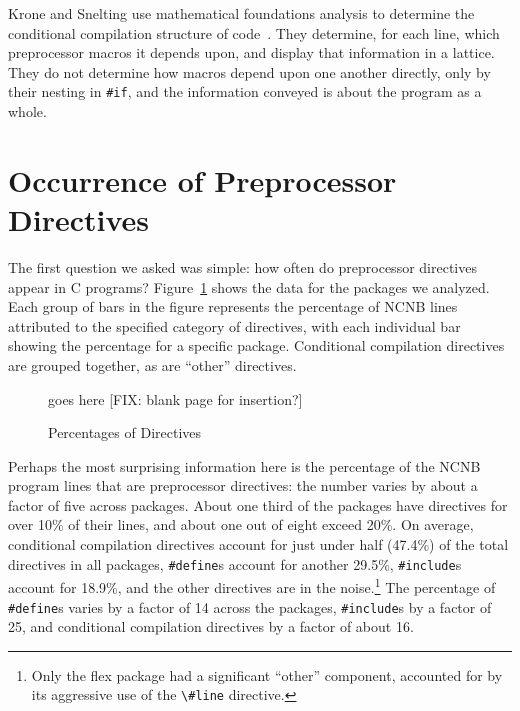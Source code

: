 Krone and Snelting use mathematical foundations analysis to determine the
conditional compilation structure of code~\cite{Krone94}.  They determine,
for each line, which preprocessor macros it depends upon, and display that
information in a lattice.  They do not determine how macros depend upon one
another directly, only by their nesting in \verb|#if|, and the information
conveyed is about the program as a whole.


\section{Occurrence of Preprocessor Directives}\label{sec:directives}

The first question we asked was simple: how often do
preprocessor directives appear in C programs?
Figure~\ref{fig:directives} shows the data for the packages we
analyzed.  Each group of bars in the figure represents the percentage of
NCNB lines attributed to the specified category of directives, with each
individual bar showing the percentage for a specific package.  Conditional
compilation directives are grouped together, as are ``other'' directives.


\begin{figure}
goes here [FIX: blank page for insertion?]
\caption{Percentages of Directives\label{fig:directives}}
\end{figure}

Perhaps the most surprising information here is the percentage of the
NCNB program lines that are preprocessor directives: the number varies
by about a factor of five across packages.  About one third of the
packages have directives for over 10\% of their lines, and about one
out of eight exceed 20\%.  On average, conditional compilation
directives account for just under half (47.4\%) of the total
directives in all packages, \verb+#define+s account for another
29.5\%, \verb+#include+s account for 18.9\%, and the other directives
are in the noise.\footnote{Only the flex package had a significant
``other'' component, accounted for by its aggressive use of the
\verb+\#line+ directive.} The percentage of \verb+#define+s varies by a factor of 14
across the packages, \verb+#include+s by a factor of 25, and
conditional compilation directives by a factor of about 16.

